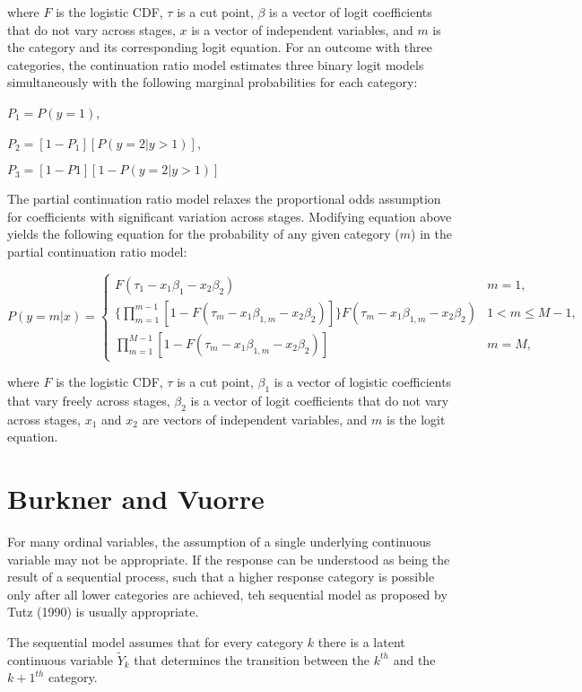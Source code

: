 where $F$ is the logistic CDF, $\tau$ is a cut point, $\beta$ is a vector of logit coefficients that do not vary across stages, $x$ is a vector of independent variables, and $m$ is the category and its corresponding logit equation. For an outcome with three categories, the continuation ratio model estimates three binary logit models simultaneously with the following marginal probabilities for each category:

$P_{1} = P(y=1)$,

$P_{2} = [1-P_{1}][P(y=2 | y>1)]$,

$P_{3} = [1-P{1}][1-P(y=2|y>1)]$

The partial continuation ratio model relaxes the proportional odds assumption for coefficients with significant variation across stages. Modifying equation above yields the following equation for the probability of any given category ($m$) in the partial continuation ratio model:


\begin{equation*}
P(y = m | x) =
\begin{cases}
F(\tau_{1} - x_{1}\beta_{1} - x_{2}\beta_{2}) & m=1,\\
\{ \prod_{m=1}^{m-1} [1-F(\tau_{m} - x_{1}\beta_{1,m} - x_{2}\beta_{2})] \} F(\tau_{m} - x_{1}\beta_{1,m} - x_{2}\beta_{2}) & 1 < m \leq M - 1, \\
\prod_{m=1}^{M-1} [1-F(\tau_{m} - x_{1}\beta_{1,m} - x_{2}\beta_{2})] & m=M,
\end{cases}
\end{equation*}

where $F$ is the logistic CDF, $\tau$ is a cut point, $\beta_{1}$ is a vector of logistic coefficients that vary freely across stages, $\beta_{2}$ is a vector of logit coefficients that do not vary across stages, $x_{1}$ and $x_{2}$ are vectors of independent variables, and $m$ is the logit equation.


\section{Burkner and Vuorre}

For many ordinal variables, the assumption of a single underlying continuous variable may not be appropriate. If the response can be understood as being the result of a sequential process, such that a higher response category is possible only after all lower categories are achieved, teh sequential model as proposed by Tutz (1990) is usually appropriate.

The sequential model assumes that for every category $k$ there is a latent continuous variable $\tilde Y_{k}$ that determines the transition between the $k^{th}$ and the $k+1^{th}$ category.

